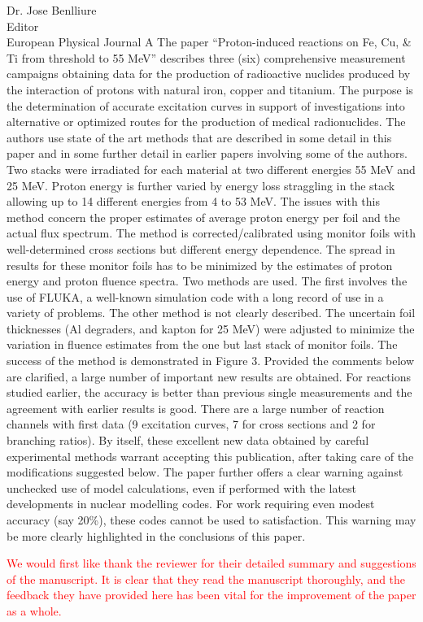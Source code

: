 \documentclass{letter} %
\newcommand{\colornote}[1]{\textcolor{red}{#1}}
\begin{document}
\begin{letter}{Dr. Jose Benlliure \\
Editor \\
European Physical Journal A}
The paper \enquote{Proton-induced reactions on Fe, Cu, \& Ti from threshold to 55 MeV} describes three (six) comprehensive measurement campaigns obtaining data for the production of radioactive nuclides produced by the interaction of protons with natural iron, copper and titanium. The purpose is the determination of accurate excitation curves in support of investigations into alternative or optimized routes for the production of medical radionuclides. The authors use state of the art methods that are described in some detail in this paper and in some further detail in earlier papers involving some of the authors. Two stacks were irradiated for each material at two different energies 55 MeV and 25 MeV. Proton energy is further varied by energy loss straggling in the stack allowing up to 14 different energies from 4 to 53 MeV. The issues with this method concern the proper estimates of average proton energy per foil and the actual flux spectrum. The method is corrected/calibrated using monitor foils with well-determined cross sections but different energy dependence. The spread in results for these monitor foils has to be minimized by the estimates of proton energy and proton fluence spectra. Two methods are used. The first involves the use of FLUKA, a well-known simulation code with a long record of use in a variety of problems. The other method is not clearly described. The uncertain foil thicknesses (Al degraders, and kapton for 25 MeV) were adjusted to minimize the variation in fluence estimates from the one but last stack of monitor foils. The success of the method is demonstrated in Figure 3.
Provided the comments below are clarified, a large number of important new results are obtained. For reactions studied earlier, the accuracy is better than previous single measurements and the agreement with earlier results is good. There are a large number of reaction channels with first data (9 excitation curves, 7 for cross sections and 2 for branching ratios). By itself, these excellent new data obtained by careful experimental methods warrant accepting this publication, after taking care of the modifications suggested below. The paper further offers a clear warning against unchecked use of model calculations, even if performed with the latest developments in nuclear modelling codes. For work requiring even modest accuracy (say 20\%), these codes cannot be used to satisfaction. This warning may be more clearly highlighted in the conclusions of this paper.


\colornote{We would first like thank the reviewer for their  detailed summary and suggestions of the manuscript. It is clear that they read the manuscript thoroughly, and the feedback they have provided here has been vital for the improvement of the paper as a whole.}


\end{letter}
\end{document}
